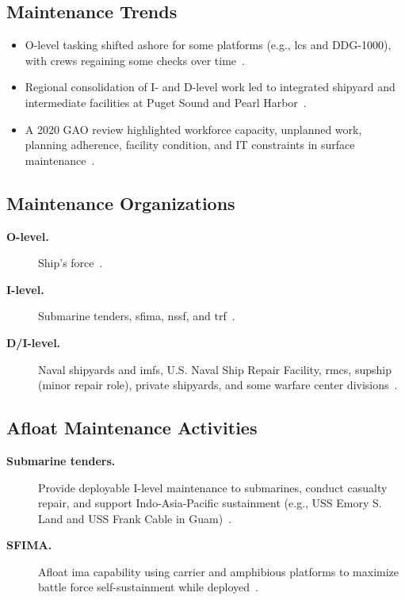 \documentclass[../main.tex]{subfiles}
\begin{document}
\subsection{Maintenance Trends}
\begin{itemize}
  \item O-level tasking shifted ashore for some platforms (e.g., \ac{lcs} and DDG-1000), with crews regaining some checks over time~\autocite{edo-4-1-1-fleet-maint-assets-2025}.
  \item Regional consolidation of I- and D-level work led to integrated shipyard and intermediate facilities at Puget Sound and Pearl Harbor~\autocite{edo-4-1-1-fleet-maint-assets-2025}.
  \item A 2020 GAO review highlighted workforce capacity, unplanned work, planning adherence, facility condition, and IT constraints in surface maintenance~\autocite{edo-4-1-1-fleet-maint-assets-2025}.
\end{itemize}

\subsection{Maintenance Organizations}
\begin{description}
  \item[\textbf{O-level.}] Ship's force~\autocite{edo-4-1-1-fleet-maint-assets-2025}.
  \item[\textbf{I-level.}] Submarine tenders, \ac{sfima}, \ac{nssf}, and \ac{trf}~\autocite{edo-4-1-1-fleet-maint-assets-2025}.
  \item[\textbf{D/I-level.}] Naval shipyards and \acp{imf}, U.S. Naval Ship Repair Facility, \acp{rmc}, \ac{supship} (minor repair role), private shipyards, and some warfare center divisions~\autocite{edo-4-1-1-fleet-maint-assets-2025}.
\end{description}

\subsection{Afloat Maintenance Activities}
\begin{description}
  \item[\textbf{Submarine tenders.}] Provide deployable I-level maintenance to submarines, conduct casualty repair, and support Indo-Asia-Pacific sustainment (e.g., USS Emory S. Land and USS Frank Cable in Guam)~\autocite{edo-4-1-1-fleet-maint-assets-2025}.
  \item[\textbf{SFIMA.}] Afloat \ac{ima} capability using carrier and amphibious platforms to maximize battle force self-sustainment while deployed~\autocite{edo-4-1-1-fleet-maint-assets-2025}.
\end{description}
\end{document}
